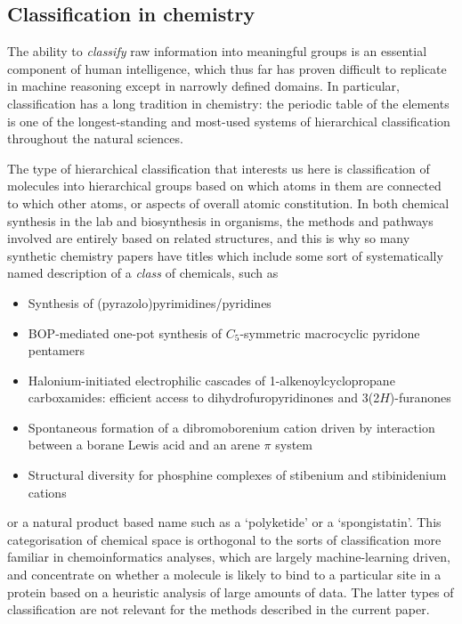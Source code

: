 \documentclass[10pt]{bmc_article}
\newenvironment{bmcformat}{\baselineskip20pt\sloppy\setboolean{publ}{false}}{\baselineskip20pt\sloppy}
\begin{document}
\begin{bmcformat}
\subsection*{Classification in chemistry}
\label{sec:backclassif}

The ability to \textit{classify} raw information into meaningful groups is an essential component of human intelligence, which thus far has proven difficult to replicate in machine reasoning except in narrowly defined domains.  In particular, classification has a long tradition in chemistry:  the periodic table of the elements is one of the longest-standing and most-used systems of hierarchical classification throughout the natural sciences.  

The type of hierarchical classification that interests us here is classification of molecules into hierarchical groups based on which atoms in them are connected to which other atoms, or aspects of overall atomic constitution.  In both chemical synthesis in the lab and biosynthesis in organisms, the methods and pathways involved are entirely based on related structures, and this is why so many synthetic chemistry papers have titles which include some sort of systematically named description of a \textit{class} of chemicals, such as
\begin{itemize}
\item Synthesis of (pyrazolo)pyrimidines/pyridines
\item BOP-mediated one-pot synthesis of $C_5$-symmetric macrocyclic pyridone pentamers
\item Halonium-initiated electrophilic cascades of 1-alkenoylcyclopropane carboxamides: efficient access to dihydrofuropyridinones and 3(2$H$)-furanones
\item Spontaneous formation of a dibromoborenium cation driven by interaction between a borane Lewis acid and an arene $\pi$ system
\item Structural diversity for phosphine complexes of stibenium and stibinidenium cations
\end{itemize}
or a natural product based name such as a `polyketide' or a `spongistatin'.  This categorisation of chemical space is orthogonal to the sorts of classification more familiar in chemoinformatics analyses, which are largely machine-learning driven, and concentrate on whether a molecule is likely to bind to a particular site in a protein based on a heuristic analysis of large amounts of data. The latter types of classification are not relevant for the methods described in the current paper.  


\end{bmcformat}
\end{document}
